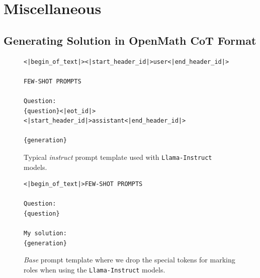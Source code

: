 
\section{Miscellaneous}




\subsection{Generating Solution in OpenMath CoT Format}
\label{sec:app_soln_format}

\begin{figure}[t]
    \centering
    \begin{tcolorbox}[
    colback=pastelblue!40,
    colframe=pastelblue!50,
    coltitle=pastelpink!50!black,
    colbacktitle=pastelpink!50,
    listing options={language=},
    fonttitle=\bfseries,
    fontupper=\ttfamily,
    halign title=center,         %
    title=Instruct Prompt Template,              %
    boxrule=0.5mm, 
    width=13cm,
]
\footnotesize
\begin{verbatim}
<|begin_of_text|><|start_header_id|>user<|end_header_id|>

FEW-SHOT PROMPTS

Question:
{question}<|eot_id|><|start_header_id|>assistant<|end_header_id|>

{generation}
\end{verbatim}
\end{tcolorbox}
    \caption{Typical \emph{instruct} prompt template used with \texttt{Llama-Instruct} models.}
    \label{fig:instruct_prompt}
\end{figure}


\begin{figure}[t]
    \centering
    \begin{tcolorbox}[
    colback=pastelblue!40,
    colframe=pastelblue!50,
    coltitle=pastelpink!50!black,
    colbacktitle=pastelpink!50,
    listing options={language=},
    fonttitle=\bfseries,
    fontupper=\ttfamily,
    halign title=center,         %
    title=Base Prompt Template,              %
    boxrule=0.5mm, 
    width=8cm,
]
\footnotesize
\begin{verbatim}
<|begin_of_text|>FEW-SHOT PROMPTS 

Question:
{question}

My solution:
{generation}
\end{verbatim}
\end{tcolorbox}
    \caption{\emph{Base} prompt template where we drop the special tokens for marking roles when using the \texttt{Llama-Instruct} models.}
    \label{fig:base_prompt}
\end{figure}


